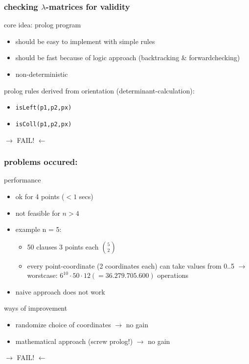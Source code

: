 \documentclass{beamer}
\begin{document}
\begin{frame}
\frametitle{checking $\lambda$-matrices for validity}
core idea: prolog program
\begin{itemize}
	\item should be easy to implement with simple rules
	\item should be fast because of logic approach (backtracking \& forwardchecking)
	\item non-deterministic
\end{itemize}
prolog rules derived from orientation (determinant-calculation):
\begin{itemize}
 \item \texttt{isLeft(p1,p2,px)}
 \item \texttt{isColl(p1,p2,px)}
\end{itemize}
\pause
\begin{center}
\huge{ $\rightarrow$ FAIL! $\leftarrow$}
\end{center}

\end{frame}



\begin{frame}
\frametitle{problems occured:}
performance
\begin{itemize}
\item ok for 4 points ($<1$ secs)
\item not feasible for $n > 4$
\item example n = 5:
\begin{itemize}
  \item 50 clauses 3 points each $\binom{5}{2}$
  \item every point-coordinate (2 coordinates each) can take values from 0..5 \newline $\rightarrow$ worstcase: $6^{10} \cdot 50 \cdot 12 (=36.279.705.600)$ operations
\end{itemize}
\item naive approach does not work
\end{itemize}
ways of improvement
\begin{itemize}
\item randomize choice of coordinates $\rightarrow$ no gain
\item mathematical approach (screw prolog!) $\rightarrow$ no gain
\end{itemize}
\pause
\begin{center}
\huge{ $\rightarrow$ FAIL! $\leftarrow$}
\end{center}
\end{frame}
\end{document}

